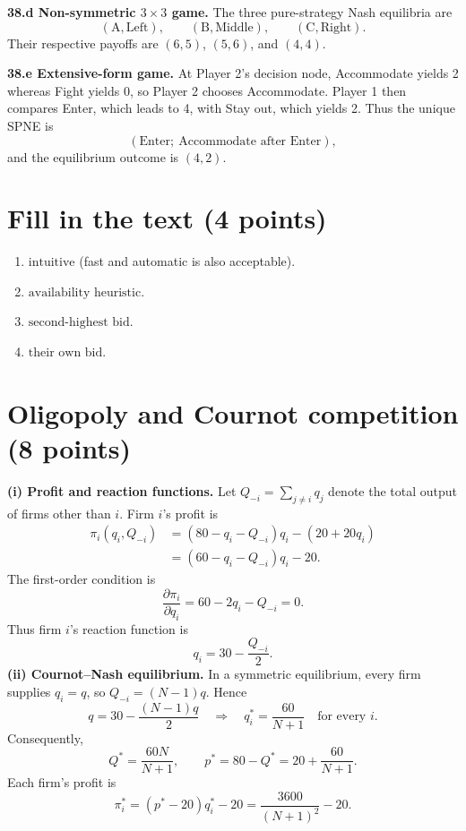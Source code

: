 \documentclass[11pt,a4paper]{article}
\begin{document}
\textbf{38.d Non-symmetric \(3\times3\) game.} The three pure-strategy Nash
equilibria are
\[
\boxed{(\text{A},\text{Left}),\qquad
(\text{B},\text{Middle}),\qquad
(\text{C},\text{Right}).}
\]
Their respective payoffs are \((6,5)\), \((5,6)\), and \((4,4)\).

\textbf{38.e Extensive-form game.} At Player 2's decision node,
Accommodate yields 2 whereas Fight yields 0, so Player 2 chooses Accommodate.
Player 1 then compares Enter, which leads to 4, with Stay out, which yields 2.
Thus the unique SPNE is
\[
\boxed{(\text{Enter};\ \text{Accommodate after Enter}),}
\]
and the equilibrium outcome is \((4,2)\).

\section{Fill in the text \hfill (4 points)}

\begin{enumerate}[label=\textbf{\alph*.}]
  \item \(\boxed{\text{intuitive}}\) (fast and automatic is also acceptable).
  \item \(\boxed{\text{availability heuristic}}\).
  \item \(\boxed{\text{second-highest bid}}\).
  \item \(\boxed{\text{their own bid}}\).
\end{enumerate}

\section{Oligopoly and Cournot competition \hfill (8 points)}

\textbf{(i) Profit and reaction functions.} Let
\(Q_{-i}=\sum_{j\ne i}q_j\) denote the total output of firms other than
\(i\). Firm \(i\)'s profit is
\[
\begin{aligned}
\pi_i(q_i,Q_{-i})
  &= (80-q_i-Q_{-i})q_i-(20+20q_i)\\
  &= (60-q_i-Q_{-i})q_i-20.
\end{aligned}
\]
The first-order condition is
\[
\frac{\partial\pi_i}{\partial q_i}=60-2q_i-Q_{-i}=0.
\]
Thus firm \(i\)'s reaction function is
\[
\boxed{q_i=30-\frac{Q_{-i}}{2}.}
\]
\textbf{(ii) Cournot--Nash equilibrium.} In a symmetric equilibrium, every
firm supplies \(q_i=q\), so \(Q_{-i}=(N-1)q\). Hence
\[
q=30-\frac{(N-1)q}{2}
\quad\Longrightarrow\quad
\boxed{q_i^*=\frac{60}{N+1}\quad\text{for every }i.}
\]
Consequently,
\[
\boxed{Q^*=\frac{60N}{N+1},\qquad
p^*=80-Q^*=20+\frac{60}{N+1}.}
\]
Each firm's profit is
\[
\pi_i^*=(p^*-20)q_i^*-20
=\boxed{\frac{3600}{(N+1)^2}-20}.
\]
\end{document}
